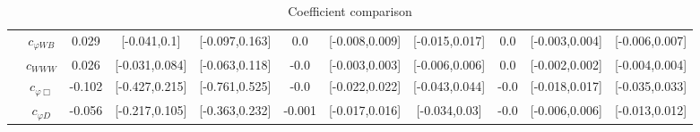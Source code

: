 \documentclass{article}
\begin{document}
\begin{table}[H]
\begin{tabular}{|c|c|c|c|c|c|c|c|c|c|c|}
 & $c_{\varphi WB}$ & 0.029                             & [-0.041,0.1]                                 & [-0.097,0.163] & 0.0                             & [-0.008,0.009]                                 & [-0.015,0.017] & 0.0                             & [-0.003,0.004]                                 & [-0.006,0.007] \\ \cline{2-11}
 & $c_{WWW}$ & 0.026                             & [-0.031,0.084]                                 & [-0.063,0.118] & -0.0                             & [-0.003,0.003]                                 & [-0.006,0.006] & 0.0                             & [-0.002,0.002]                                 & [-0.004,0.004] \\ \cline{2-11}
 & $c_{\varphi \Box}$ & -0.102                             & [-0.427,0.215]                                 & [-0.761,0.525] & -0.0                             & [-0.022,0.022]                                 & [-0.043,0.044] & -0.0                             & [-0.018,0.017]                                 & [-0.035,0.033] \\ \cline{2-11}
 & $c_{\varphi D}$ & -0.056                             & [-0.217,0.105]                                 & [-0.363,0.232] & -0.001                             & [-0.017,0.016]                                 & [-0.034,0.03] & -0.0                             & [-0.006,0.006]                                 & [-0.013,0.012] \\ \cline{2-11}
\hline
\end{tabular}
\caption{Coefficient comparison}
\end{table}
\end{document}
